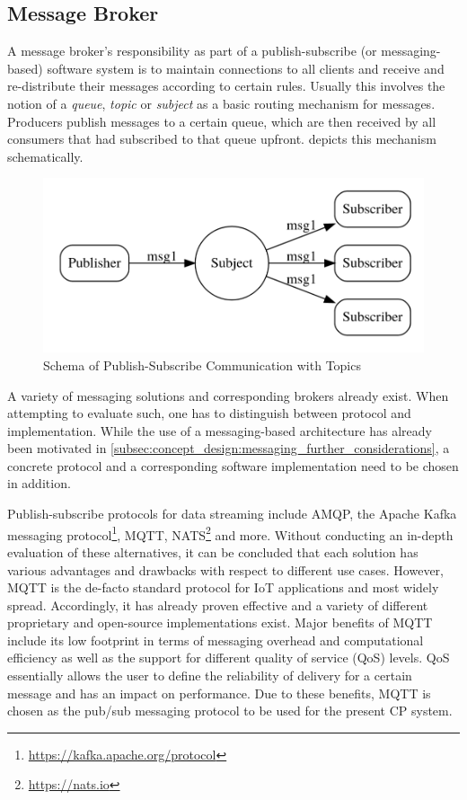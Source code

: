 \subsection{Message Broker}
\label{subsec:implementation:message_broker}
A message broker's responsibility as part of a publish-subscribe (or messaging-based) software system is to maintain connections to all clients and receive and re-distribute their messages according to certain rules. Usually this involves the notion of a \textit{queue}, \textit{topic} or \textit{subject} as a basic routing mechanism for messages. Producers publish messages to a certain queue, which are then received by all consumers that had subscribed to that queue upfront.  depicts this mechanism schematically. 

\begin{figure}
	\centering
	\includegraphics[width=0.65\linewidth]{98_images/pubsub}
	\caption[Schema of Publish-Subscribe Communication with Topics]{Schema of Publish-Subscribe Communication with Topics \cite{Collison2019}}
	\label{fig:pubsub_topics}
\end{figure}


A variety of messaging solutions and corresponding brokers already exist. When attempting to evaluate such, one has to distinguish between protocol and implementation. While the use of a messaging-based architecture has already been motivated in \cref{subsec:concept_design:messaging_further_considerations}, a concrete protocol and a corresponding software implementation need to be chosen in addition. 

Publish-subscribe protocols for data streaming include AMQP, the Apache Kafka messaging protocol\footnote{\url{https://kafka.apache.org/protocol}}, MQTT, NATS\footnote{\url{https://nats.io}} and more. Without conducting an in-depth evaluation of these alternatives, it can be concluded that each solution has various advantages and drawbacks with respect to different use cases. However, MQTT is the de-facto standard protocol for IoT applications and most widely spread. Accordingly, it has already proven effective and a variety of different proprietary and open-source implementations exist. Major benefits of MQTT include its low footprint in terms of messaging overhead and computational efficiency as well as the support for different quality of service (QoS) levels. QoS essentially allows the user to define the reliability of delivery for a certain message and has an impact on performance. Due to these benefits, MQTT is chosen as the pub/sub messaging protocol to be used for the present CP system. 

